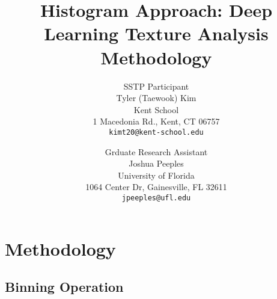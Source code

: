 \documentclass[10pt,twocolumn,letterpaper]{article}
\begin{document}

\title{
	Histogram Approach: Deep Learning Texture Analysis \\ 
	\large Methodology}


\author{SSTP Participant\\
Tyler (Taewook) Kim\\
Kent School\\
1 Macedonia Rd., Kent, CT 06757\\
{\tt\small kimt20@kent-school.edu} 
\and
Grduate Research Assistant\\
Joshua Peeples\\
University of Florida\\
1064 Center Dr, Gainesville, FL 32611\\
{\tt\small jpeeples@ufl.edu}
}

\maketitle



\section{Methodology}

\subsection{Binning Operation}
\end{document}

